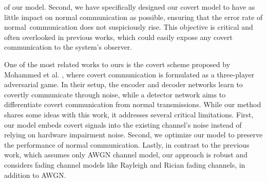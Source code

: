 of our model. Second, we have specifically designed our covert model to have as little impact on normal communication as possible, ensuring that the error rate of normal communication does not suspiciously rise. This objective is critical and often overlooked in previous works, which could easily expose any covert communication to the system's observer.

One of the most related works to ours is the covert scheme proposed by Mohammed et al. \cite{mohammed2021adversarial}, where covert communication is formulated as a three-player adversarial game. In their setup, the encoder and decoder networks learn to covertly communicate through noise, while a detector network aims to differentiate covert communication from normal transmissions. While our method shares some ideas with this work, it addresses several critical limitations. First, our model embeds covert signals into the existing channel's noise instead of relying on hardware impairment noise. Second, we optimize our model to preserve the performance of normal communication. Lastly, in contrast to the previous work, which assumes only AWGN channel model, our approach is robust and considers fading channel models like Rayleigh and Rician fading channels, in addition to AWGN.